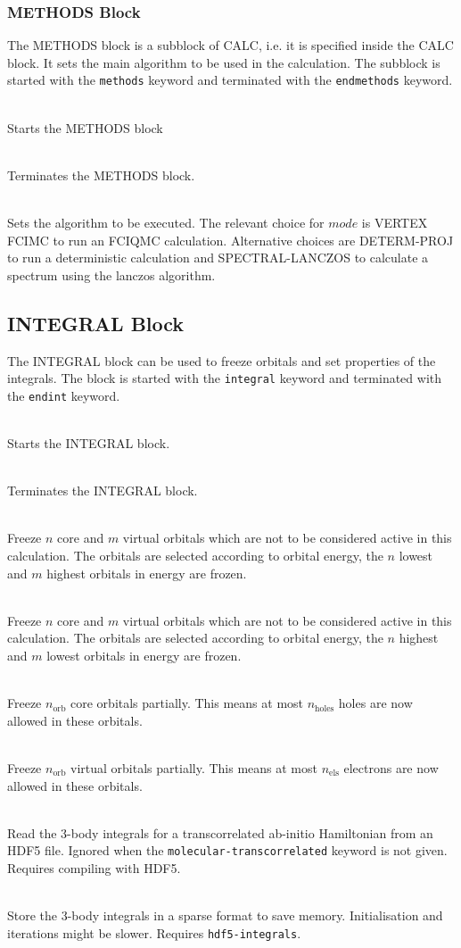 \documentclass[a4paper,notitlepage,dvipsnames]{scrreprt}
\newcommand\codeitem[1]{\needspace{1.5\baselineskip}\item[\textnormal{\ttfamily #1 \nopagebreak}] \hfill \\ \nopagebreak}
\begin{document}
  \subsubsection{METHODS Block}
  The METHODS block is a subblock of CALC, i.e. it is specified inside the
  CALC block. It sets the main algorithm to be used in the calculation. The
  subblock is started with the \texttt{methods} keyword and terminated with
  the \texttt{endmethods} keyword.
  \begin{description}
    \codeitem{\textcolor{mred}{methods}}
    Starts the METHODS block
    \codeitem{\textcolor{mred}{endmethods}}
    Terminates the METHODS block.
    \codeitem{\textcolor{mred}{method $mode$}}
    Sets the algorithm to be executed. The relevant choice for $mode$ is
    VERTEX FCIMC to run an FCIQMC calculation. Alternative choices are
    DETERM-PROJ to run a deterministic calculation and SPECTRAL-LANCZOS to
    calculate a spectrum using the lanczos algorithm.
  \end{description}

  \subsection{INTEGRAL Block}
  The INTEGRAL block can be used to freeze orbitals and set properties of the
  integrals. The block is started with the \texttt{integral} keyword and
  terminated with the \texttt{endint} keyword.
  \begin{description}
    \codeitem{integral}
    Starts the INTEGRAL block.
    \codeitem{endint}
    Terminates the INTEGRAL block.
    \codeitem{freeze $n$ $m$}
    Freeze $n$ core and $m$ virtual orbitals which are not to be
    considered active in this calculation. The orbitals are selected
    according to orbital energy, the $n$ lowest and $m$ highest orbitals in
    energy are frozen.
    \codeitem{freezeInner $n$ $m$}
    Freeze $n$ core and $m$ virtual orbitals which are not to be
    considered active in this calculation. The orbitals are selected
    according to orbital energy, the $n$ highest and $m$ lowest orbitals in
    energy are frozen.
    \codeitem{partiallyFreeze $n_\text{orb}$ $n_\text{holes}$}
    Freeze $n_\text{orb}$ core orbitals partially. This means at most
    $n_\text{holes}$ holes are now allowed in these orbitals.
    \codeitem{partiallyFreezeVirt $n_\text{orb}$ $n_\text{els}$}
    Freeze $n_\text{orb}$ virtual orbitals partially. This means at most
    $n_\text{els}$ electrons are now allowed in these orbitals.
    \codeitem{hdf5-integrals}
    Read the 3-body integrals for a transcorrelated ab-initio Hamiltonian from an HDF5
    file. Ignored when the \texttt{molecular-transcorrelated} keyword is not
    given. Requires compiling with HDF5.
    \codeitem{sparse-lmat}
    Store the 3-body integrals in a sparse format to save
    memory. Initialisation and iterations might be slower. Requires \texttt{hdf5-integrals}.
  \end{description}
\end{document}

